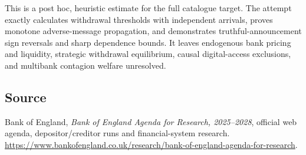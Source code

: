\documentclass[11pt]{article}
\begin{document}
This is a post hoc, heuristic estimate for the full catalogue target.
The attempt exactly calculates withdrawal thresholds with independent arrivals, proves monotone adverse-message propagation, and demonstrates truthful-announcement sign reversals and sharp dependence bounds. It leaves endogenous bank pricing and liquidity, strategic withdrawal equilibrium, causal digital-access exclusions, and multibank contagion welfare unresolved.

\subsection*{Source}
Bank of England, \emph{Bank of England Agenda for Research, 2025--2028},
official web agenda, depositor/creditor runs and financial-system research.
\url{https://www.bankofengland.co.uk/research/bank-of-england-agenda-for-research}.
\end{document}
